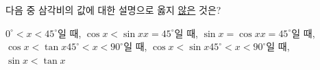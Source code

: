 다음 중 삼각비의 값에 대한 설명으로 옳지 \underline{않은} 것은?
\begin{choicesv}{$0^\circ<x<45^\circ$일 때, $\cos x<\sin x$}{$x=45^\circ$일 때, $\sin x=\cos x$}{$x=45^\circ$일 때, $\cos x<\tan x$}{$45^\circ<x<90^\circ$일 때, $\cos x<\sin x$}{$45^\circ<x<90^\circ$일 때, $\sin x<\tan x$}\end{choicesv}
